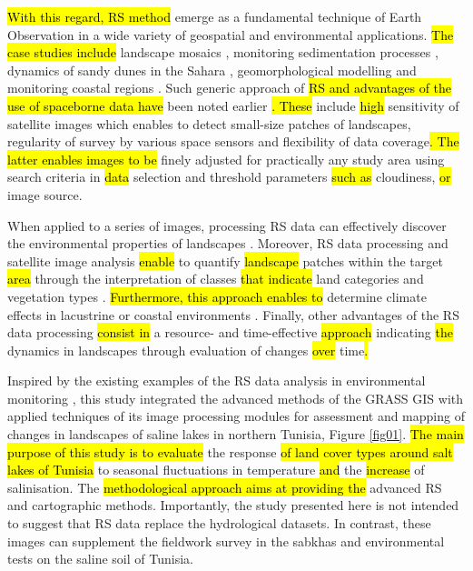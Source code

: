 \documentclass[land,article,submit,pdftex,moreauthors]{Definitions/mdpi}
\begin{document}
\hl{With this regard, RS method} emerge as a fundamental technique of Earth Observation in a wide variety of geospatial and environmental applications. \hl{The case studies include }landscape mosaics \cite{BIARNES2021103281}, monitoring sedimentation processes \cite{TOWNSHEND1989177}, dynamics of sandy dunes in the Sahara \cite{Afrasinei}, geomorphological modelling \cite{Desprats} and monitoring coastal regions \cite{AMROUNI201973,Jaquet}. Such generic approach of \hl{RS and advantages of the use of spaceborne data have} been noted earlier \cite{RAMPHERI2023103359}\hl{. These} include \hl{high} sensitivity of satellite images which enables to detect small-size patches of landscapes, regularity of survey by various space sensors and flexibility of data coverage\hl{. The latter enables images to be} finely adjusted for practically any study area using search criteria in \hl{data} selection and threshold parameters \hl{such as }cloudiness, \hl{or} image source. 

When applied to a series of images, processing RS data can effectively discover the environmental properties of  landscapes \cite{Toujani,Quarmby,Gelebo}. Moreover, RS data processing and satellite image analysis \hl{enable }to quantify \hl{landscape} patches within the target \hl{area} through the interpretation of classes \hl{that indicate} land categories and vegetation types \cite{Benedetti,Godinho}. \hl{Furthermore, this approach enables to} determine climate effects in lacustrine or coastal environments \cite{Souissi}. Finally, other advantages of the RS data processing \hl{consist in} a resource- and time-effective \hl{approach} indicating \hl{the }dynamics in landscapes through evaluation of changes \hl{over} time\hl{.} 

Inspired by the existing examples of the RS data analysis in environmental monitoring \cite{f9020059,Lemenkova202229,Fathalli,Abbas,Henchiri}, this study integrated the advanced methods of the GRASS GIS with applied techniques of its image processing modules for assessment and mapping of changes in landscapes of saline lakes in northern Tunisia, Figure \ref{fig01}. \hl{The main purpose of this study is to evaluate} the response \hl{of land cover types around salt lakes of Tunisia }to seasonal fluctuations in temperature \hl{and} the \hl{increase} of salinisation. The \hl{methodological approach aims at providing the} advanced RS and cartographic methods. Importantly, the study presented here is not intended to suggest that RS data replace the hydrological datasets. In contrast, these images can supplement the fieldwork survey in the sabkhas and environmental tests on the saline soil of Tunisia. 
\end{document}
